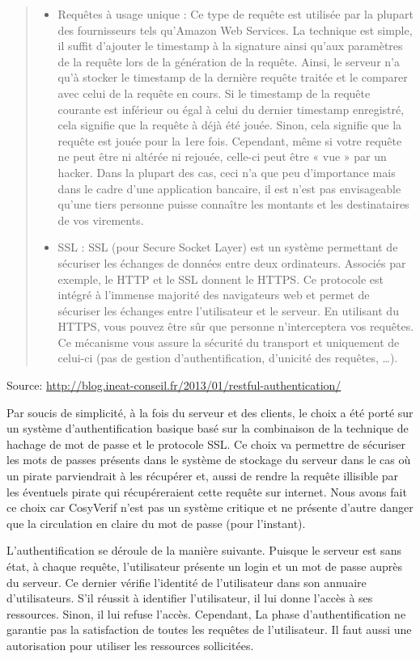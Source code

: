 \documentclass{report}
\begin{document}
\begin{quotation}
\begin{itemize}
\item  Requêtes à usage unique : Ce type de requête est utilisée par la plupart des fournisseurs tels qu’Amazon Web 
Services. La technique est simple, il suffit d’ajouter le timestamp à la signature ainsi qu’aux paramètres de la requête lors 
de la génération de la requête. Ainsi, le serveur n’a qu’à stocker le timestamp de la dernière requête traitée et le 
comparer avec celui de la requête en cours. Si le timestamp de la requête courante est inférieur ou égal à celui du dernier 
timestamp enregistré, cela signifie que la requête à déjà été jouée. Sinon, cela signifie que la requête est jouée pour la 
1ere fois. Cependant, même si votre requête ne peut être ni altérée ni rejouée, celle-ci peut être « vue » par un hacker. Dans la plupart des cas, ceci n’a que peu d’importance mais dans le cadre d’une application bancaire, il est n’est pas envisageable qu’une tiers personne puisse connaître les montants et les destinataires de vos virements.
\item  SSL : SSL (pour Secure Socket Layer) est un système permettant de sécuriser les échanges de données entre deux 
ordinateurs. Associés par exemple, le HTTP et le SSL donnent le HTTPS. Ce protocole est intégré à l’immense majorité des 
navigateurs web et permet de sécuriser les échanges entre l’utilisateur et le serveur. En utilisant du HTTPS, vous pouvez 
être sûr que personne n’interceptera vos requêtes. Ce mécanisme vous assure la sécurité du transport et uniquement de 
celui-ci (pas de gestion d’authentification, d’unicité des requêtes, …).
\end{itemize}
\end{quotation}
\hfill{Source: \url{http://blog.ineat-conseil.fr/2013/01/restful-authentication/}}

\medskip

Par soucis de simplicité, à la fois du serveur et des clients, le choix a été porté sur un système d'authentification basique basé sur la combinaison de la technique de hachage de 
mot de passe et le protocole SSL. Ce choix va permettre de sécuriser les mots de passes présents dans le système de
stockage du serveur dans le cas où un pirate parviendrait à les récupérer et, aussi de rendre la requête illisible par les 
éventuels pirate qui récupéreraient cette requête sur internet. Nous avons fait ce choix car CosyVerif n'est pas un système
critique et ne présente d'autre danger que la circulation en claire du mot de passe
(pour l'instant).

L'authentification se déroule de la manière suivante. Puisque le serveur est
sans état, à chaque requête, l'utilisateur présente un login et un mot de passe auprès du serveur.
Ce dernier vérifie l'identité de l'utilisateur dans son annuaire d'utilisateurs. S'il réussit à identifier l'utilisateur, il lui donne l'accès à 
ses ressources. Sinon, il lui refuse l'accès. Cependant, La phase d'authentification ne garantie pas la satisfaction de toutes 
les requêtes de l'utilisateur. Il faut aussi une autorisation pour utiliser les ressources sollicitées.
\end{document}
